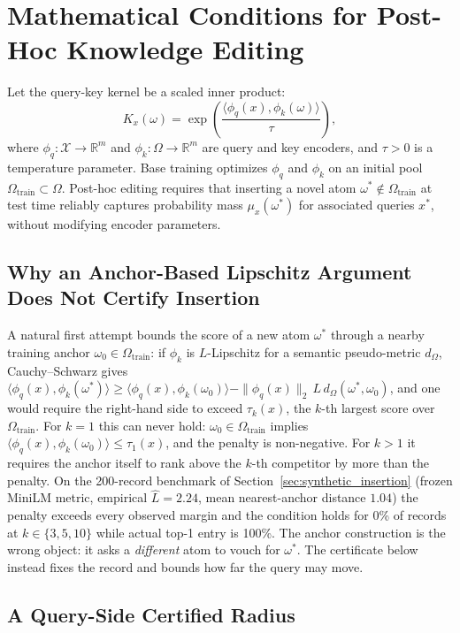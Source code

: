 \documentclass[preprint,12pt]{elsarticle}
\newcommand{\R}{\mathbb{R}}
\newcommand{\Om}{\Omega}
\newcommand{\rev}[1]{#1}
\begin{document}
\section{Mathematical Conditions for Post-Hoc Knowledge Editing}
\label{sec:editing}

Let the query-key kernel be a scaled inner product:
\[
  K_x(\omega) = \exp\left( \frac{\langle \phi_q(x), \phi_k(\omega) \rangle}{\tau} \right),
\]
where $\phi_q : \mathcal X \to \R^m$ and $\phi_k : \Om \to \R^m$ are query and key encoders, and $\tau > 0$ is a temperature parameter. Base training optimizes $\phi_q$ and $\phi_k$ on an initial pool $\Om_{\mathrm{train}} \subset \Om$. Post-hoc editing requires that inserting a novel atom $\omega^* \notin \Om_{\mathrm{train}}$ at test time reliably captures probability mass $\mu_x(\omega^*)$ for associated queries $x^*$, without modifying encoder parameters.

\subsection{Why an Anchor-Based Lipschitz Argument Does Not Certify Insertion}
\label{sec:anchor_remark}

\rev{A natural first attempt bounds the score of a new atom $\omega^*$ through a nearby training anchor $\omega_0\in\Om_{\mathrm{train}}$: if $\phi_k$ is $L$-Lipschitz for a semantic pseudo-metric $d_\Om$, Cauchy--Schwarz gives $\langle\phi_q(x),\phi_k(\omega^*)\rangle\ge\langle\phi_q(x),\phi_k(\omega_0)\rangle-\|\phi_q(x)\|_2\,L\,d_\Om(\omega^*,\omega_0)$, and one would require the right-hand side to exceed $\tau_k(x)$, the $k$-th largest score over $\Om_{\mathrm{train}}$. For $k=1$ this can never hold: $\omega_0\in\Om_{\mathrm{train}}$ implies $\langle\phi_q(x),\phi_k(\omega_0)\rangle\le\tau_1(x)$, and the penalty is non-negative. For $k>1$ it requires the anchor itself to rank above the $k$-th competitor by more than the penalty. On the 200-record benchmark of Section~\ref{sec:synthetic_insertion} (frozen MiniLM metric, empirical $\hat L=2.24$, mean nearest-anchor distance $1.04$) the penalty exceeds every observed margin and the condition holds for 0\% of records at $k\in\{3,5,10\}$ while actual top-1 entry is 100\%. The anchor construction is the wrong object: it asks a \emph{different} atom to vouch for $\omega^*$. The certificate below instead fixes the record and bounds how far the query may move.}

\subsection{A Query-Side Certified Radius}
\end{document}
